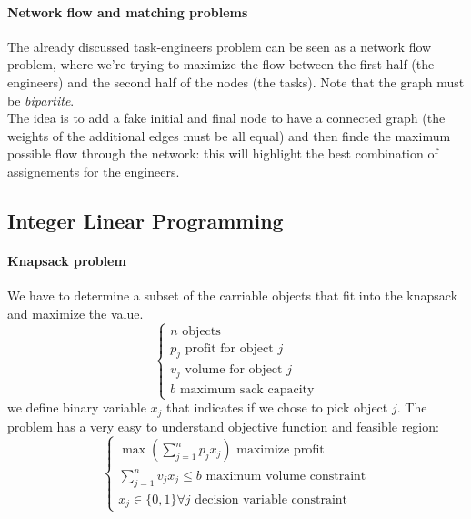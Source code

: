 \documentclass{article}
\begin{document}
			\paragraph{Network flow and matching problems}
				The already discussed task-engineers problem can be seen as a network flow problem, where we're trying to maximize the flow between the first half (the engineers) and the second half of the nodes (the tasks). Note that the graph must be \textit{bipartite}.\\
				The idea is to add a fake initial and final node to have a connected graph (the weights of the additional edges must be all equal) and then finde the maximum possible flow through the network: this will highlight the best combination of assignements for the engineers.


		\subsection{Integer Linear Programming}
			\paragraph{Knapsack problem}
				We have to determine a subset of the carriable objects that fit into the knapsack and maximize the value.
				\begin{equation}
					\begin{cases}
						n \text{ objects} \\
						p_j \text{ profit for object } j \\
						v_j \text{ volume for object } j \\
						b \text{ maximum sack capacity}
					\end{cases}
				\end{equation}
				we define binary variable $x_j$ that indicates if we chose to pick object $j$. The problem has a very easy to understand objective function and feasible region:
				\begin{equation}
					\begin{cases}
						\max(\sum_{j=1}^n p_j x_j) \text{ maximize profit}\\
						\sum_{j=1}^n v_j x_j \leq b \text{ maximum volume constraint}\\
						x_j \in \{0, 1\} \forall j \text{ decision variable constraint}
					\end{cases}
				\end{equation}
\end{document}
